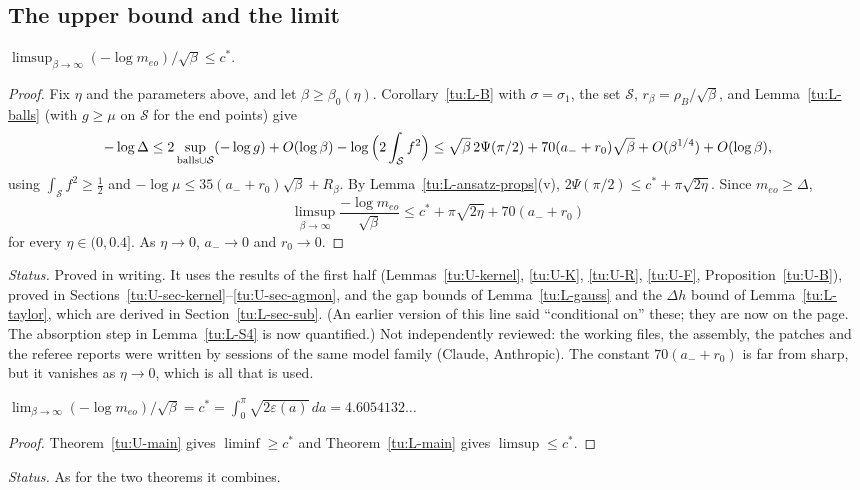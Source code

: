 \subsection{The upper bound and the limit}

\begin{theorem}\label{tu:L-main}
$\limsup_{\beta\to\infty}(-\log m_{eo})/\sqrt\beta\le c^*$.
\end{theorem}

\begin{proof}
Fix $\eta$ and the parameters above, and let $\beta\ge\beta_0(\eta)$. Corollary~\ref{tu:L-B} with $\sigma=\sigma_1$, the set $\mathcal S$,
$r_\beta=\rho_B/\sqrt\beta$, and Lemma~\ref{tu:L-balls} (with $g\ge\mu$ on $\mathcal S$ for the end points) give
\[
-\log\Delta\le2\sup_{\rm balls\cup\mathcal S}(-\log g)+O(\log\beta)-\log\Big(2\int_{\mathcal S}f^2\Big)
\le\sqrt\beta\,2\Psi(\pi/2)+70(a_-+r_0)\sqrt\beta+O(\beta^{1/4})+O(\log\beta),
\]
using $\int_{\mathcal S}f^2\ge\frac12$ and $-\log\mu\le35(a_-+r_0)\sqrt\beta+R_\beta$. By Lemma~\ref{tu:L-ansatz-props}(v),
$2\Psi(\pi/2)\le c^*+\pi\sqrt{2\eta}$. Since $m_{eo}\ge\Delta$,
\[
\limsup_{\beta\to\infty}\frac{-\log m_{eo}}{\sqrt\beta}\le c^*+\pi\sqrt{2\eta}+70(a_-+r_0)
\]
for every $\eta\in(0,0.4]$. As $\eta\to0$, $a_-\to0$ and $r_0\to0$.
\end{proof}

\noindent\emph{Status.} Proved in writing. It uses the results of the first half (Lemmas~\ref{tu:U-kernel},
\ref{tu:U-K}, \ref{tu:U-R}, \ref{tu:U-F}, Proposition~\ref{tu:U-B}), proved in Sections~\ref{tu:U-sec-kernel}--\ref{tu:U-sec-agmon}, and the gap bounds of
Lemma~\ref{tu:L-gauss} and the $\Delta h$ bound of Lemma~\ref{tu:L-taylor}, which are derived in Section~\ref{tu:L-sec-sub}. (An earlier
version of this line said ``conditional on'' these; they are now on the page. The absorption step in Lemma~\ref{tu:L-S4} is now
quantified.) Not independently reviewed: the working files, the assembly, the patches and the referee reports were written by
sessions of the same model family (Claude, Anthropic). The constant $70(a_-+r_0)$ is far
from sharp, but it vanishes as $\eta\to0$, which is all that is used.

\begin{corollary}\label{tu:L-limit}
$\lim_{\beta\to\infty}(-\log m_{eo})/\sqrt\beta=c^*=\int_0^\pi\sqrt{2\varepsilon(a)}\,da=4.6054132\ldots$
\end{corollary}

\begin{proof}
Theorem~\ref{tu:U-main} gives $\liminf\ge c^*$ and Theorem~\ref{tu:L-main} gives $\limsup\le c^*$.
\end{proof}

\noindent\emph{Status.} As for the two theorems it combines.
